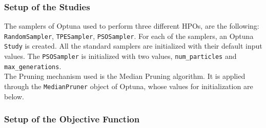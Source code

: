 \subsubsection{Setup of the Studies}

The samplers of Optuna used to perform three different HPOs, are the following: \texttt{RandomSampler}, \texttt{TPESampler}, \texttt{PSOSampler}.
For each of the samplers, an Optuna \texttt{Study} is created. All the standard samplers are initialized with their default input values. The \texttt{PSOSampler} is initialized with two values, \texttt{num\_particles} and \texttt{max\_generations}.
\\[0.3cm]The Pruning mechanism used is the Median Pruning algorithm. It is applied through the \texttt{MedianPruner} object of Optuna, whose values for initialization are below.

\subsubsection{Setup of the Objective Function}

